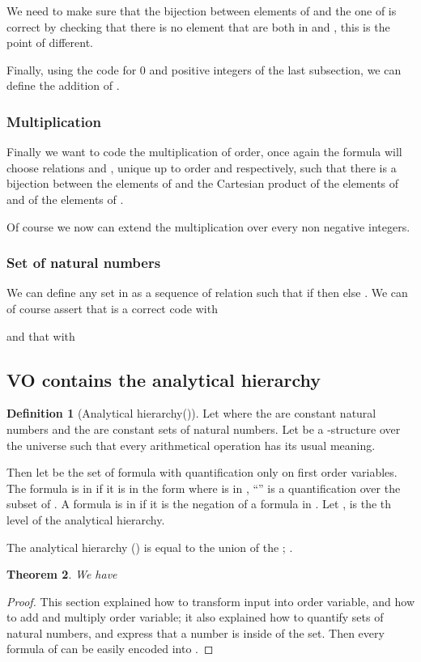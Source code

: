 \documentclass[a4paper,12pt]{article}
\newcommand{\sss}[1]{\subsubsection{#1}}
\newtheorem{theorem}{Theorem}[section]
\theoremstyle{definition}
\newtheorem{definition}[theorem]{Definition}
\begin{document}
We need to make sure that the bijection between elements of 
and the one of  is correct by checking that there is no element
that are both in  and  , this is the point of
different.











Finally, using the code for 0 and positive integers of the last
subsection, we can define the addition of .

\sss{Multiplication}
Finally we want to code the multiplication of order, once again the
formula  will choose relations  and ,
unique up to order  and  respectively, such that there is a
bijection between the elements of  and the Cartesian product of
the elements of  and of the elements of .

Of course we now can extend the multiplication over every non negative
integers.


\sss{Set of natural numbers}
We can define any set  in \VO{} as a sequence of
relation  such that if  then  else
. We can of course assert that  is a correct
code with

and that  with 



\subsection{VO contains the analytical hierarchy}






\begin{definition}[Analytical hierarchy(\AnH)]
  Let  where
  the  are constant natural numbers and the  are constant
  sets of natural numbers. Let  be a -structure over the
  universe  such that every arithmetical operation has
  its usual meaning.

  Then let  be the set of
  formula with quantification only on first order variables. The
  formula  is in  if it is in the form
   where  is in , ``'' is a quantification over the subset of .  A
  formula is in  if it is the negation of a formula in
  . Let ,
   is the th level of the analytical hierarchy.

  The analytical hierarchy (\AnH) is equal to the union of the
  ; .
\end{definition}




\begin{theorem}
We have
\end{theorem}\label{anhvo}
\begin{proof}This section explained how to transform input into order
  variable, and how to add and multiply order variable; it also
  explained how to quantify sets of natural numbers, and express that
  a number is inside of the set.  Then every formula of \AnH{} can be
  easily encoded into \VO.







\end{proof}
\end{document}
